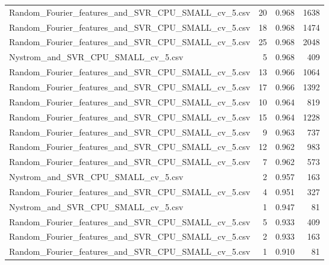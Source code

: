 \begin{tabularx}{\textwidth}{lrrr}
Random\_Fourier\_features\_and\_SVR\_CPU\_SMALL\_cv\_5.csv &       20 &               0.968 &          1638 \\
Random\_Fourier\_features\_and\_SVR\_CPU\_SMALL\_cv\_5.csv &       18 &               0.968 &          1474 \\
Random\_Fourier\_features\_and\_SVR\_CPU\_SMALL\_cv\_5.csv &       25 &               0.968 &          2048 \\
                Nystrom\_and\_SVR\_CPU\_SMALL\_cv\_5.csv &        5 &               0.968 &           409 \\
Random\_Fourier\_features\_and\_SVR\_CPU\_SMALL\_cv\_5.csv &       13 &               0.966 &          1064 \\
Random\_Fourier\_features\_and\_SVR\_CPU\_SMALL\_cv\_5.csv &       17 &               0.966 &          1392 \\
Random\_Fourier\_features\_and\_SVR\_CPU\_SMALL\_cv\_5.csv &       10 &               0.964 &           819 \\
Random\_Fourier\_features\_and\_SVR\_CPU\_SMALL\_cv\_5.csv &       15 &               0.964 &          1228 \\
Random\_Fourier\_features\_and\_SVR\_CPU\_SMALL\_cv\_5.csv &        9 &               0.963 &           737 \\
Random\_Fourier\_features\_and\_SVR\_CPU\_SMALL\_cv\_5.csv &       12 &               0.962 &           983 \\
Random\_Fourier\_features\_and\_SVR\_CPU\_SMALL\_cv\_5.csv &        7 &               0.962 &           573 \\
                Nystrom\_and\_SVR\_CPU\_SMALL\_cv\_5.csv &        2 &               0.957 &           163 \\
Random\_Fourier\_features\_and\_SVR\_CPU\_SMALL\_cv\_5.csv &        4 &               0.951 &           327 \\
                Nystrom\_and\_SVR\_CPU\_SMALL\_cv\_5.csv &        1 &               0.947 &            81 \\
Random\_Fourier\_features\_and\_SVR\_CPU\_SMALL\_cv\_5.csv &        5 &               0.933 &           409 \\
Random\_Fourier\_features\_and\_SVR\_CPU\_SMALL\_cv\_5.csv &        2 &               0.933 &           163 \\
Random\_Fourier\_features\_and\_SVR\_CPU\_SMALL\_cv\_5.csv &        1 &               0.910 &            81 \\
\bottomrule
\end{tabularx}
